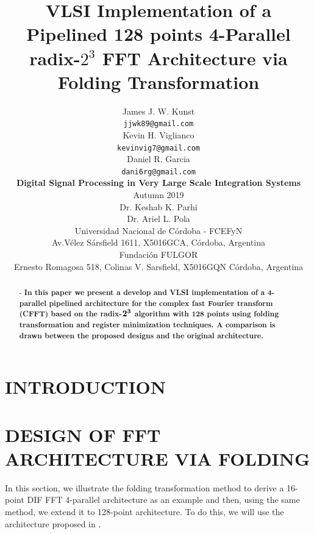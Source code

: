 \documentclass[a4paper, 10pt, conference]{ieeeconf}
\begin{document}
\title{
\huge \bf VLSI Implementation of a Pipelined 128 points 4-Parallel radix-$2^3$ FFT Architecture via Folding Transformation
}
\author{
James J. W. Kunst    	\\{\tt\small jjwk89@gmail.com}		\\
Kevin H. Viglianco	\\{\tt\small kevinvig7@gmail.com}	\\ 
Daniel R. Garcia	\\{\tt\small dani6rg@gmail.com}		\\
[0.5cm]
{\large \bf Digital Signal Processing in Very Large Scale Integration Systems}\\
[0.5cm]
Autumn 2019\\
[0.5cm]
Dr. Keshab K. Parhi	\\
Dr. Ariel L. Pola	\\
[0.5cm]
Universidad Nacional de Córdoba - FCEFyN\\Av.Vélez Sársfield 1611, X5016GCA, C\'ordoba, Argentina\\
[0.5cm]
Fundación FULGOR\\
Ernesto Romagosa 518, Colinas V. Sarsfield, X5016GQN Córdoba, Argentina         
}
\maketitle


\begin{abstract} - \bf In this paper we present a develop and VLSI implementation of a 4-parallel pipelined architecture for the complex fast Fourier transform (CFFT) based on the radix-$\bf 2^3$ algorithm with 128 points using folding transformation and register minimization techniques. A comparison is drawn between the proposed designs and the original architecture.
\end{abstract}
\section{INTRODUCTION}
\section{DESIGN OF FFT ARCHITECTURE VIA FOLDING}
In this section, we illustrate the folding transformation method to derive a 16-point DIF FFT 4-parallel architecture as an example and then, using the same method, we extend it to 128-point architecture. To do this, we will use the architecture proposed in \cite{ayinala_pipelined_2012}.
\end{document}
